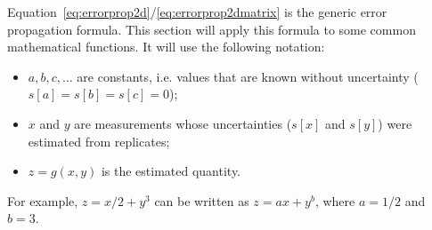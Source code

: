 Equation~\ref{eq:errorprop2d}/\ref{eq:errorprop2dmatrix} is the
generic error propagation formula. This section will apply this
formula to some common mathematical functions. It will use the
following notation:

\begin{itemize}
\item{$a, b, c, \ldots$} are constants, i.e. values that are known
  without uncertainty ($s[a]=s[b]=s[c]=0$);
\item{$x$ and $y$} are measurements whose uncertainties ($s[x]$ and
  $s[y]$) were estimated from replicates;
\item{$z = g(x,y)$} is the estimated quantity.
\end{itemize}

\noindent For example, $z = x/2 + y^3$ can be written as $z = a x +
y^b$, where $a=1/2$ and $b=3$.

